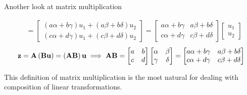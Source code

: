 \documentclass[aspectratio=169]{beamer}
\def\mf{\ensuremath\mathbf}
\def\lp{\ensuremath\left(}
\def\rp{\ensuremath\right)}
\begin{document}
\begin{frame}[t]{Another look at matrix multiplication}
\begin{scriptsize}
\[\begin{split}
&= \begin{bmatrix}\left(a\alpha + b\gamma\right) u_1 + \left(a\beta + b\delta\right)u_2 \\ \left(c\alpha + d\gamma\right)u_1  + \left(c\beta + d\delta\right)u_2 \end{bmatrix} = \begin{bmatrix}a\alpha + b\gamma & a\beta + b\delta \\ c\alpha + d\gamma & c\beta + d\delta \end{bmatrix} \begin{bmatrix}u_1 \\ u_2 \end{bmatrix}
\end{split}
\]
\[\mf{z} = \mf{A}\lp\mf{B}\mf{u}\rp = \lp\mf{A}\mf{B}\rp\mf{u} \implies \mf{A}\mf{B} = \begin{bmatrix}a & b \\ c & d\end{bmatrix}\begin{bmatrix}\alpha & \beta \\ \gamma & \delta\end{bmatrix} = \begin{bmatrix}a\alpha + b\gamma & a\beta + b\delta \\ c\alpha + d\gamma & c\beta + d\delta \end{bmatrix}
\]
\end{scriptsize}
This definition of matrix multiplication is the most natural for dealing with composition of linear transformations.
\end{frame}
\end{document}
